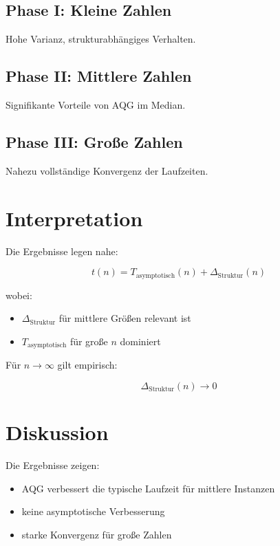 \documentclass[11pt,a4paper]{article}
\begin{document}
	\subsection{Phase I: Kleine Zahlen}
	Hohe Varianz, strukturabhängiges Verhalten.
	
	\subsection{Phase II: Mittlere Zahlen}
	Signifikante Vorteile von AQG im Median.
	
	\subsection{Phase III: Große Zahlen}
	Nahezu vollständige Konvergenz der Laufzeiten.
	
	\section{Interpretation}
	
	Die Ergebnisse legen nahe:
	
	\begin{equation}
		t(n) = T_{\text{asymptotisch}}(n) + \Delta_{\text{Struktur}}(n)
	\end{equation}
	
	wobei:
	
	\begin{itemize}
		\item $\Delta_{\text{Struktur}}$ für mittlere Größen relevant ist
		\item $T_{\text{asymptotisch}}$ für große $n$ dominiert
	\end{itemize}
	
	Für $n \to \infty$ gilt empirisch:
	
	\begin{equation}
		\Delta_{\text{Struktur}}(n) \to 0
	\end{equation}
	
	\section{Diskussion}
	
	Die Ergebnisse zeigen:
	
	\begin{itemize}
		\item AQG verbessert die typische Laufzeit für mittlere Instanzen
		\item keine asymptotische Verbesserung
		\item starke Konvergenz für große Zahlen
	\end{itemize}
	
\end{document}
